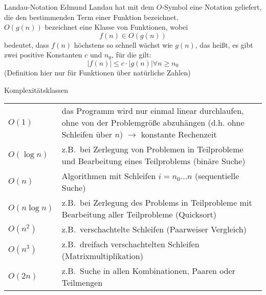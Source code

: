\begin{defi}{Landau-Notation}
    Edmund Landau hat mit dem $O$-Symbol eine Notation geliefert,
    die den bestimmenden Term einer Funktion bezeichnet. \\
    $O(g(n))$ bezeichnet eine Klasse von Funktionen, wobei
    \[f(n) \in O(g(n))\]
    bedeutet, dass $f(n)$ höchstens so schnell wächst wie $g(n)$,
    das heißt, es gibt zwei positive Konstanten $c$ und $n_0$,
    für die gilt:
    \[|f(n)| \leq c \cdot |g(n)| \forall n \geq n_0\]
    (Definition hier nur für Funktionen über natürliche Zahlen)
\end{defi}

\begin{example}{Komplexitätsklassen}
    \begin{tabular}{|l|l|}
        $O(1)$        & das Programm wird nur einmal linear durchlaufen, ohne von der Problemgröße abzuhängen (d.h. ohne Schleifen über $n$) $\to$ konstante Rechenzeit \\
        $O(\log n)$   & z.B.\ bei Zerlegung von Problemen in Teilprobleme und Bearbeitung eines Teilproblems (binäre Suche)                                             \\
        $O(n)$        & Algorithmen mit Schleifen $i = n_0 \ldots n$ (sequentielle Suche)                                                                               \\
        $O(n \log n)$ & z.B.\ bei Zerlegung des Problems in Teilprobleme mit Bearbeitung aller Teilprobleme (Quicksort)                                                 \\
        $O(n^2)$      & z.B.\ verschachtelte Schleifen (Paarweiser Vergleich)                                                                                           \\
        $O(n^3)$      & z.B.\ dreifach verschachtelten Schleifen (Matrixmultiplikation)                                                                                 \\
        $O(2n)$       & z.B.\ Suche in allen Kombinationen, Paaren oder Teilmengen
    \end{tabular}
\end{example}



